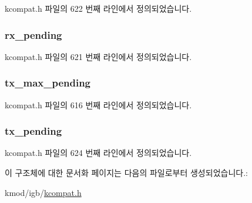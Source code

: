 kcompat.\+h 파일의 622 번째 라인에서 정의되었습니다.

\subsubsection[{\texorpdfstring{rx\+\_\+pending}{rx_pending}}]{ rx\+\_\+pending}\hypertarget{struct__kc__ethtool__ringparam_a089fcbd1792ff7a725eeb8050dff0385}{}\label{struct__kc__ethtool__ringparam_a089fcbd1792ff7a725eeb8050dff0385}


kcompat.\+h 파일의 621 번째 라인에서 정의되었습니다.

\subsubsection[{\texorpdfstring{tx\+\_\+max\+\_\+pending}{tx_max_pending}}]{ tx\+\_\+max\+\_\+pending}\hypertarget{struct__kc__ethtool__ringparam_a069a95758c7547b6b105a3adb28919e4}{}\label{struct__kc__ethtool__ringparam_a069a95758c7547b6b105a3adb28919e4}


kcompat.\+h 파일의 616 번째 라인에서 정의되었습니다.

\subsubsection[{\texorpdfstring{tx\+\_\+pending}{tx_pending}}]{ tx\+\_\+pending}\hypertarget{struct__kc__ethtool__ringparam_a8abdfe3c020777d3def6bddad111e887}{}\label{struct__kc__ethtool__ringparam_a8abdfe3c020777d3def6bddad111e887}


kcompat.\+h 파일의 624 번째 라인에서 정의되었습니다.



이 구조체에 대한 문서화 페이지는 다음의 파일로부터 생성되었습니다.\+:\begin{DoxyCompactItemize}
\item 
kmod/igb/\hyperlink{kcompat_8h}{kcompat.\+h}\end{DoxyCompactItemize}
